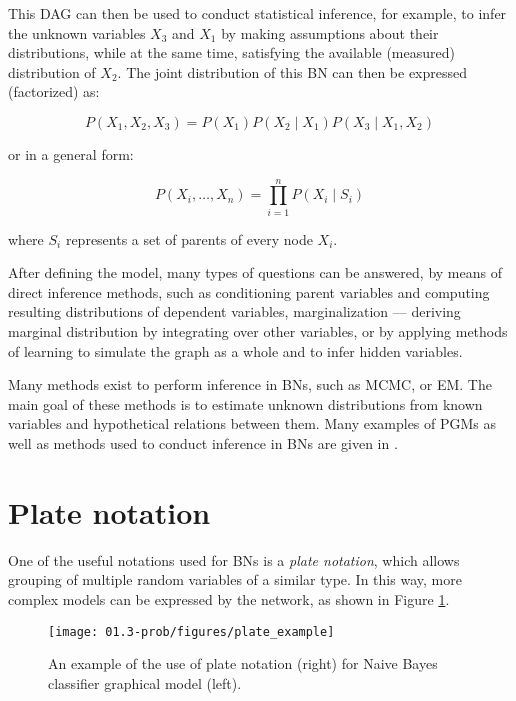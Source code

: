 This DAG can then be used to conduct statistical inference, for example, to infer the unknown variables $X_3$ and $X_1$ by making assumptions about their distributions, while at the same time, satisfying the available (measured) distribution of $X_2$. The joint distribution of this BN can then be expressed (factorized) as:

\begin{equation}
P{(X_1, X_2, X_3)} = P{(X_1)} P{(X_2 \mid X_1)} P{(X_3 \mid X_1, X_2)}
\end{equation}

or in a general form:

\begin{equation}
P{(X_i, \ldots, X_n)} = \prod_{i=1}^{n} P{(X_i \mid S_i)}
\end{equation}

where $S_i$ represents a set of parents of every node $X_i$.

After defining the model, many types of questions can be answered, by means of direct inference methods, such as conditioning parent variables and computing resulting distributions of dependent variables, marginalization --- deriving marginal distribution by integrating over other variables,  or by applying methods of learning to simulate the graph as a whole and to infer hidden variables.

Many methods exist to perform inference in \glspl{BN}, such as \gls{MCMC}, or \gls{EM}. The main goal of these methods is to estimate unknown distributions from known variables and hypothetical relations between them. Many examples of \glspl{PGM} as well as methods used to conduct inference in \glspl{BN} are given in \cite{koller2009probabilistic}. 

\section{Plate notation}

One of the useful notations used for \glspl{BN} is a \textit{plate notation}, which allows grouping of multiple random variables of a similar type. In this way, more complex models can be expressed by the network, as shown in Figure \ref{fig:plate-example}.

\begin{figure}[H]
	\centering
	\texttt{[image: 01.3-prob/figures/plate\_example]}
	\caption{An example of the use of plate notation (right) for Naive Bayes classifier graphical model (left).}
	\label{fig:plate-example}
\end{figure}

